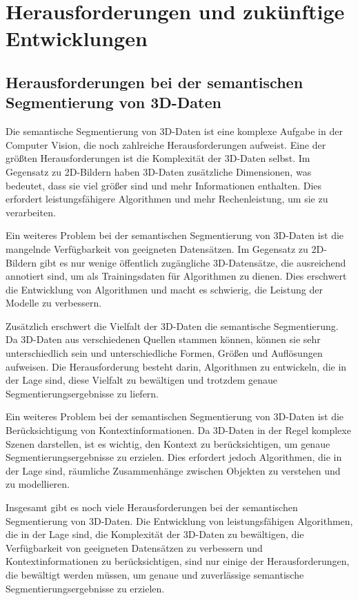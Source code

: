 \chapter{Herausforderungen und zukünftige Entwicklungen}
\section{Herausforderungen bei der semantischen Segmentierung von 3D-Daten}
Die semantische Segmentierung von 3D-Daten ist eine komplexe Aufgabe in der
Computer Vision, die noch zahlreiche Herausforderungen aufweist. Eine der
größten Herausforderungen ist die Komplexität der 3D-Daten selbst. Im Gegensatz
zu 2D-Bildern haben 3D-Daten zusätzliche Dimensionen, was bedeutet, dass sie
viel größer sind und mehr Informationen enthalten. Dies erfordert
leistungsfähigere Algorithmen und mehr Rechenleistung, um sie zu verarbeiten.

Ein weiteres Problem bei der semantischen Segmentierung von 3D-Daten ist die
mangelnde Verfügbarkeit von geeigneten Datensätzen. Im Gegensatz zu 2D-Bildern
gibt es nur wenige öffentlich zugängliche 3D-Datensätze, die ausreichend
annotiert sind, um als Trainingsdaten für Algorithmen zu dienen. Dies erschwert
die Entwicklung von Algorithmen und macht es schwierig, die Leistung der
Modelle zu verbessern.

Zusätzlich erschwert die Vielfalt der 3D-Daten die semantische Segmentierung.
Da 3D-Daten aus verschiedenen Quellen stammen können, können sie sehr
unterschiedlich sein und unterschiedliche Formen, Größen und Auflösungen
aufweisen. Die Herausforderung besteht darin, Algorithmen zu entwickeln, die in
der Lage sind, diese Vielfalt zu bewältigen und trotzdem genaue
Segmentierungsergebnisse zu liefern.

Ein weiteres Problem bei der semantischen Segmentierung von 3D-Daten ist die
Berücksichtigung von Kontextinformationen. Da 3D-Daten in der Regel komplexe
Szenen darstellen, ist es wichtig, den Kontext zu berücksichtigen, um genaue
Segmentierungsergebnisse zu erzielen. Dies erfordert jedoch Algorithmen, die in
der Lage sind, räumliche Zusammenhänge zwischen Objekten zu verstehen und zu
modellieren.

Insgesamt gibt es noch viele Herausforderungen bei der semantischen
Segmentierung von 3D-Daten. Die Entwicklung von leistungsfähigen Algorithmen,
die in der Lage sind, die Komplexität der 3D-Daten zu bewältigen, die
Verfügbarkeit von geeigneten Datensätzen zu verbessern und Kontextinformationen
zu berücksichtigen, sind nur einige der Herausforderungen, die bewältigt werden
müssen, um genaue und zuverlässige semantische Segmentierungsergebnisse zu
erzielen.
